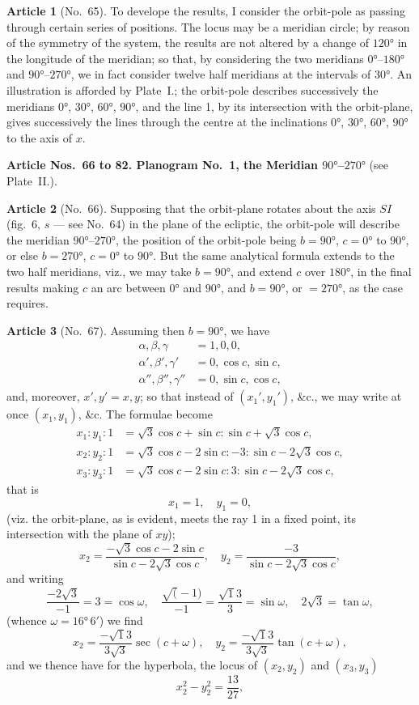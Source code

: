 \documentclass[11pt,a4paper]{article}
\theoremstyle{definition}
\newtheorem{art}{Article}
\begin{document}
\begin{art}[No.~65]
To develope the results, I consider the orbit-pole as passing through certain series of positions. The locus may be a meridian circle; by reason of the symmetry of the system, the results are not altered by a change of $120°$ in the longitude of the meridian; so that, by considering the two meridians $0°$--$180°$ and $90°$--$270°$, we in fact consider twelve half meridians at the intervals of $30°$. An illustration is afforded by Plate~I.; the orbit-pole describes successively the meridians $0°$, $30°$, $60°$, $90°$, and the line 1, by its intersection with the orbit-plane, gives successively the lines through the centre at the inclinations $0°$, $30°$, $60°$, $90°$ to the axis of $x$.
\end{art}

\noindent\textbf{Article Nos.~66 to 82. Planogram No.~1, the Meridian $90°$--$270°$} (see Plate~II.).

\begin{art}[No.~66]
Supposing that the orbit-plane rotates about the axis $SI$ (fig.~6, $s$ --- see No.~64) in the plane of the ecliptic, the orbit-pole will describe the meridian $90°$--$270°$, the position of the orbit-pole being $b=90°$, $c=0°$ to $90°$, or else $b=270°$, $c=0°$ to $90°$. But the same analytical formula extends to the two half meridians, viz., we may take $b=90°$, and extend $c$ over $180°$, in the final results making $c$ an arc between $0°$ and $90°$, and $b=90°$, or $=270°$, as the case requires.
\end{art}

\begin{art}[No.~67]
Assuming then $b=90°$, we have
\begin{align*}
\alpha, \beta, \gamma &= 1, 0, 0,\\
\alpha', \beta', \gamma' &= 0, \cos c, \sin c,\\
\alpha'', \beta'', \gamma'' &= 0, \sin c, \cos c,
\end{align*}
and, moreover, $x', y' = x, y$; so that instead of $(x_1', y_1')$, \&c., we may write at once $(x_1, y_1)$, \&c. The formulae become
\begin{align*}
x_1 : y_1 : 1 &= \surd 3 \cos c + \sin c : \sin c + \surd 3 \cos c,\\
x_2 : y_2 : 1 &= \surd 3 \cos c - 2 \sin c : -3 : \sin c - 2\surd 3 \cos c,\\
x_3 : y_3 : 1 &= \surd 3 \cos c - 2 \sin c : 3 : \sin c - 2\surd 3 \cos c,
\end{align*}
that is
\[
x_1 = 1, \quad y_1 = 0,
\]
(viz. the orbit-plane, as is evident, meets the ray 1 in a fixed point, its intersection with the plane of $xy$);
\[
x_2 = \frac{-\surd 3 \cos c - 2 \sin c}{\sin c - 2\surd 3 \cos c}, \quad
y_2 = \frac{-3}{\sin c - 2\surd 3 \cos c},
\]
and writing
\[
\frac{-2\surd 3}{-1} = 3 = \cos\omega, \quad \frac{\surd(-1)}{-1} = \frac{\surd 13}{3} = \sin\omega, \quad 2\surd 3 = \tan\omega,
\]
(whence $\omega = 16°\, 6'$) we find
\[
x_2 = \frac{-\surd 13}{3\surd 3} \sec(c+\omega), \quad
y_2 = \frac{-\surd 13}{3\surd 3} \tan(c+\omega),
\]
and we thence have for the hyperbola, the locus of $(x_2, y_2)$ and $(x_3, y_3)$
\[
x_2^2 - y_2^2 = \frac{13}{27},
\]
\end{art}
\end{document}
